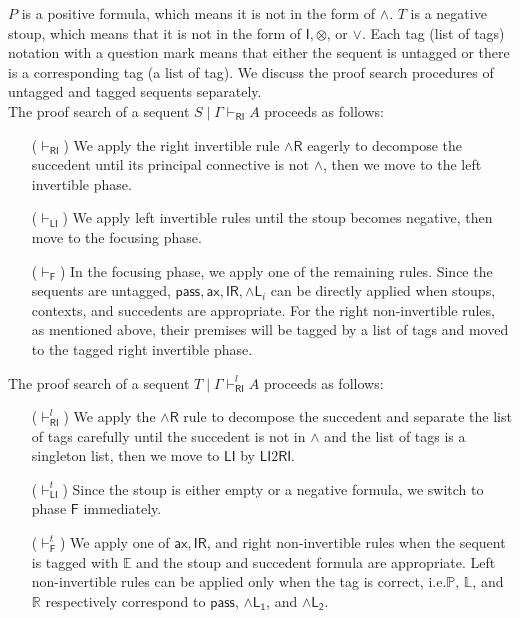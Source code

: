 \documentclass[submission,copyright,creativecommons]{eptcs}
\theoremstyle{definition}
\newcommand{\pass}{\mathsf{pass}}
\newcommand{\unitr}{\mathsf{IR}}
\newcommand{\andlone}{\land \mathsf{L_{1}}}
\newcommand{\andltwo}{\land \mathsf{L_{2}}}
\newcommand{\andli}{\land \mathsf{L}_{i}}
\newcommand{\andr}{\land \mathsf{R}}
\newcommand{\ax}{\mathsf{ax}}
\newcommand{\ot}{\otimes}
\newcommand{\I}{\mathsf{I}}
\newcommand{\RI}{\mathsf{RI}}
\newcommand{\LI}{\mathsf{LI}}
\newcommand{\Pass}{\mathsf{P}}
\newcommand{\F}{\mathsf{F}}
\newcommand{\tP}{\mathbb{P}}
\newcommand{\tL}{\mathbb{L}}
\newcommand{\tR}{\mathbb{R}}
\newcommand{\tE}{\mathbb{E}}
\begin{document}
$P$ is a positive formula, which means it is not in the form of $\land$.
$T$ is a negative stoup, which means that it is not in the form of $\I , \ot$, or $\lor$.
Each tag (list of tags) notation with a question mark means that either the sequent is untagged or there is a corresponding tag (a list of tag).
We discuss the proof search procedures of untagged and tagged sequents separately.
\\
The proof search of a sequent $S \mid \Gamma \vdash_\RI A$ proceeds as follows:
\begin{itemize}
  \item[($\vdash_{\RI}$)] We apply the right invertible rule $\andr$ eagerly to decompose the succedent until its principal connective is not $\land$, then we move to the left invertible phase.
  \item[($\vdash_{\LI}$)] We apply left invertible rules until the stoup becomes negative, then move to the focusing phase.
  \item[($\vdash_{\F}$)] In the focusing phase, we apply one of the remaining rules. Since the sequents are untagged, $\pass, \ax , \unitr , \andli$ can be directly applied when stoups, contexts, and succedents are appropriate.
  For the right non-invertible rules, as mentioned above, their premises will be tagged by a list of tags and moved to the tagged right invertible phase.
\end{itemize}
The proof search of a sequent $T \mid \Gamma \vdash^{l}_\RI A$ proceeds as follows:
\begin{itemize}
  \item[($\vdash^{l}_{\RI}$)] We apply the $\andr$ rule to decompose the succedent and separate the list of tags carefully until the succedent is not in $\land$ and the list of tags is a singleton list, then we move to $\LI$ by $\LI2 \RI$.
  \item[($\vdash^{t}_{\LI}$)] Since the stoup is either empty or a negative formula, we switch to phase $\F$ immediately.
  \item[($\vdash^{t}_{\F}$)] We apply one of $\ax , \unitr$, and right non-invertible rules when the sequent is tagged with $\tE$ and the stoup and succedent formula are appropriate. 
  Left non-invertible rules can be applied only when the tag is correct, i.e.$\tP$, $\tL$, and $\tR$ respectively correspond to $\pass$, $\andlone$, and $\andltwo$.
\end{itemize}
\end{document}
